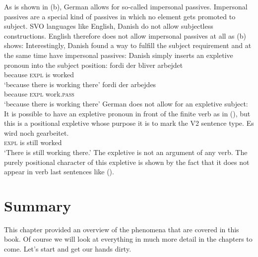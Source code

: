 As is shown in (b), German allows for so-called impersonal passives. Impersonal passives are
a special kind of passives in which no element gets promoted to subject. SVO languages like English,
Danish do not allow subjectless constructions. English therefore does not allow impersonal passives
at all as (b) shows:
\eal
{}
\zl
Interestingly, Danish found a way to fulfill the subject requirement and at the same time have
impersonal passives: Danish simply inserts an expletive pronoun into the subject position:
\eal
\label{ex-bliver-arbejder}
\ex 
\gll fordi der bliver arbejdet\\
     because \textsc{expl} is worked\\\danish
\glt `because there is working there'
\ex
\gll fordi   der arbejdes\\
     because  \textsc{expl} work.\textsc{pass}\\
\glt `because there is working there'
\zl
German does not allow for an expletive subject:
\z
It is possible to have an expletive pronoun in front of the finite verb as in (), but this is
a positional expletive whose purpose it is to mark the V2 sentence type. 
\ea
\gll  Es wird noch gearbeitet.\\
      \textsc{expl} is still worked\\\german
\glt `There is still working there.'
\z
The expletive is not an argument of any verb. The purely positional character of this expletive is shown by the fact that it does not
appear in verb last sentences like ().

\section{Summary}

This chapter provided an overview of the phenomena that are covered in this book. Of course we will
look at everything in much more detail in the chapters to come. Let's start and get our hands dirty.






